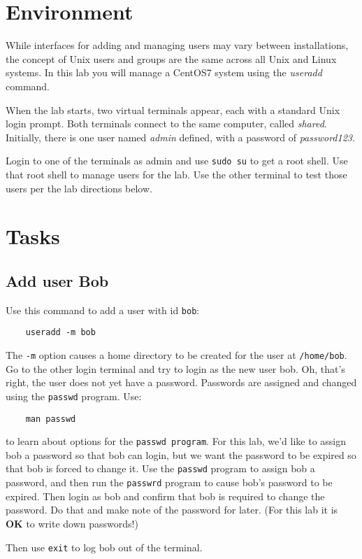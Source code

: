 \section{Environment}
While interfaces for adding and managing users may vary between installations, the concept of Unix users
and groups are the same across all Unix and Linux systems.  In this lab you will manage a CentOS7 system
using the \textit{useradd} command.

When the lab starts, two virtual terminals appear, each with a standard Unix login prompt.  Both terminals
connect to the same computer, called \textit{shared}.  Initially, there is one user named \textit{admin} defined, 
with a password of \textit{password123}.

Login to one of the terminals as admin and use {\tt sudo su} to get a root shell.
Use that root shell to manage users for the lab.  Use the other terminal to test those users per the
lab directions below.

\section{Tasks}

\subsection{Add user Bob}
Use this command to add a user with id {\tt bob}:
\begin{verbatim}
    useradd -m bob
\end{verbatim}
The {\tt -m} option causes a home directory to be created for the user at {\tt /home/bob}.
Go to the other login terminal and try to login as the new user bob.  Oh, that's right, the user
does not yet have a password.  Passwords are assigned and changed using the {\tt passwd} program. Use:
\begin{verbatim}
    man passwd
\end{verbatim}
\noindent to learn about options for the {\tt passwd program}.  For this lab, we'd like to assign bob a password so
that bob can login, but we want the password to be expired so that bob is forced to change it.
Use the {\tt passwd} program to assign bob a password, and then run the {\tt passwrd} program to cause
bob's password to be expired.  Then login as bob and confirm that bob is required
to change the password.  Do that and make note of the password for later.  (For this lab it is \textbf{OK} to write down
passwords!)

Then use {\tt exit} to log bob out of the terminal.

